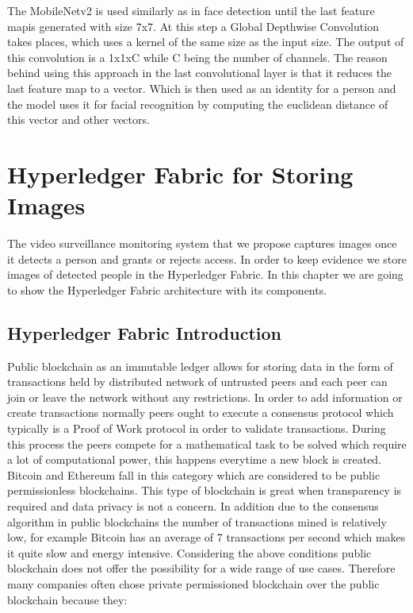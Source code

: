The MobileNetv2 is used similarly as in face detection until the last feature mapis generated with size 7x7. At this step a Global Depthwise Convolution takes places, which uses a kernel of the same size as the input size. The output of this convolution is a 1x1xC while C being the number of channels. The reason behind using this approach in the last convolutional layer is that it reduces the last feature map to a vector. Which is then used as an identity for a person and the model uses it for facial recognition by computing the euclidean distance of this vector and other vectors. 



\chapter{Hyperledger Fabric for Storing Images}


 The video surveillance monitoring system that we propose captures images once it detects a person and grants or rejects access. In order to keep evidence we store images of detected people in the Hyperledger Fabric. 
 In this chapter we are going to show the Hyperledger Fabric architecture with its components. 


\section{Hyperledger Fabric Introduction}
Public blockchain as an immutable ledger allows for storing data in the form of transactions held by distributed network of untrusted peers and each peer can join or leave the network without any restrictions. In order to add information or create transactions normally peers ought to execute a consensus protocol which typically is a Proof of Work protocol in order to validate transactions. During this process  the peers compete for a mathematical task to be solved which require a lot of computational power, this happens everytime a new block is created. Bitcoin and Ethereum fall in this category which are considered to be public permissionless blockchains. This type of blockchain is great when transparency is required and data privacy is not a concern. 
In addition due to the consensus algorithm in public blockchains the number of transactions mined is relatively low, for example Bitcoin has an average of 7 transactions per second which makes it quite slow and energy intensive. Considering the above conditions public blockchain does not offer the possibility for a wide range of use cases. Therefore many companies often chose private permissioned blockchain over the public blockchain because they: 


